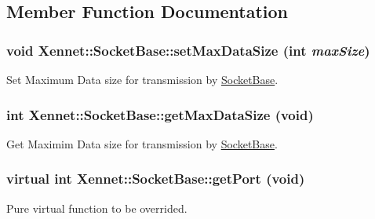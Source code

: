 \subsection{Member Function Documentation}
\hypertarget{classXennet_1_1SocketBase_cfa5e4a24d42a2f02a5426aa3658a24d}{
\subsubsection{\setlength{\rightskip}{0pt plus 5cm}void Xennet::SocketBase::setMaxDataSize (int {\em maxSize})}}
\label{classXennet_1_1SocketBase_cfa5e4a24d42a2f02a5426aa3658a24d}


Set Maximum Data size for transmission by \hyperlink{classXennet_1_1SocketBase}{SocketBase}. 

\hypertarget{classXennet_1_1SocketBase_feee0b760a929f4cdde223713ef701db}{
\subsubsection{\setlength{\rightskip}{0pt plus 5cm}int Xennet::SocketBase::getMaxDataSize (void)}}
\label{classXennet_1_1SocketBase_feee0b760a929f4cdde223713ef701db}


Get Maximim Data size for transmission by \hyperlink{classXennet_1_1SocketBase}{SocketBase}. 

\hypertarget{classXennet_1_1SocketBase_7828be0b543226b668458390a294bf0d}{
\subsubsection{\setlength{\rightskip}{0pt plus 5cm}virtual int Xennet::SocketBase::getPort (void)}}
\label{classXennet_1_1SocketBase_7828be0b543226b668458390a294bf0d}


Pure virtual function to be overrided. 

